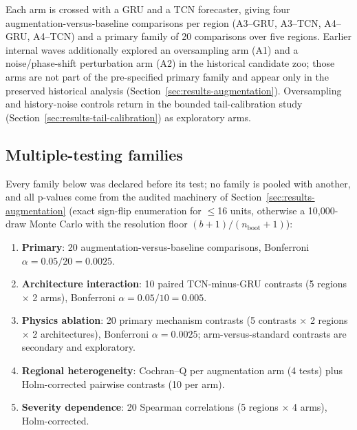 Each arm is crossed with a GRU and a TCN forecaster, giving four
augmentation-versus-baseline comparisons per region (A3--GRU, A3--TCN,
A4--GRU, A4--TCN) and a primary family of 20 comparisons over five regions.
Earlier internal waves additionally explored an oversampling arm (A1) and a
noise/phase-shift perturbation arm (A2) in the historical candidate zoo;
those arms are not part of the pre-specified primary family and appear only
in the preserved historical analysis (Section~\ref{sec:results-augmentation}).
Oversampling and history-noise controls return in the bounded tail-calibration
study (Section~\ref{sec:results-tail-calibration}) as exploratory arms.

\subsection{Multiple-testing families}
\label{subsec:families}
Every family below was declared before its test; no family is pooled with
another, and all p-values come from the audited machinery of
Section~\ref{sec:results-augmentation} (exact sign-flip enumeration for
$\le$16 units, otherwise a 10{,}000-draw Monte Carlo with the resolution
floor $(b+1)/(n_{\text{boot}}+1)$):

\begin{enumerate}
    \item \textbf{Primary}: 20 augmentation-versus-baseline comparisons,
    Bonferroni $\alpha = 0.05/20 = 0.0025$.
    \item \textbf{Architecture interaction}: 10 paired TCN-minus-GRU
    contrasts (5 regions $\times$ 2 arms), Bonferroni
    $\alpha = 0.05/10 = 0.005$.
    \item \textbf{Physics ablation}: 20 primary mechanism contrasts (5
    contrasts $\times$ 2 regions $\times$ 2 architectures), Bonferroni
    $\alpha = 0.0025$; arm-versus-standard contrasts are secondary and
    exploratory.
    \item \textbf{Regional heterogeneity}: Cochran--Q per augmentation arm
    (4 tests) plus Holm-corrected pairwise contrasts (10 per arm).
    \item \textbf{Severity dependence}: 20 Spearman correlations
    (5 regions $\times$ 4 arms), Holm-corrected.
\end{enumerate}

